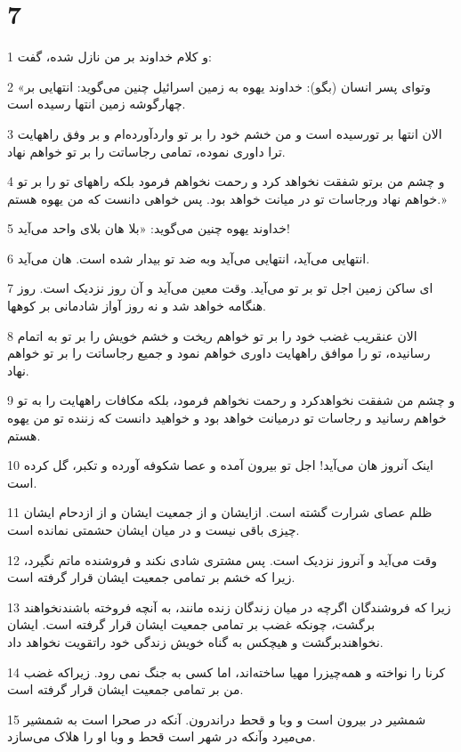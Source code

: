 \chapter{7}

\par 1 و کلام خداوند بر من نازل شده، گفت:
\par 2 «وتو‌ای پسر انسان (بگو): خداوند یهوه به زمین اسرائیل چنین می‌گوید: انتهایی بر چهارگوشه زمین انتها رسیده است.
\par 3 الان انتها بر تورسیده است و من خشم خود را بر تو واردآورده‌ام و بر وفق راههایت ترا داوری نموده، تمامی رجاساتت را بر تو خواهم نهاد.
\par 4 و چشم من برتو شفقت نخواهد کرد و رحمت نخواهم فرمود بلکه راههای تو را بر تو خواهم نهاد ورجاسات تو در میانت خواهد بود. پس خواهی دانست که من یهوه هستم.»
\par 5 خداوند یهوه چنین می‌گوید: «بلا هان بلای واحد می‌آید!
\par 6 انتهایی می‌آید، انتهایی می‌آید وبه ضد تو بیدار شده است. هان می‌آید.
\par 7 ‌ای ساکن زمین اجل تو بر تو می‌آید. وقت معین می‌آید و آن روز نزدیک است. روز هنگامه خواهد شد و نه روز آواز شادمانی بر کوهها.
\par 8 الان عنقریب غضب خود را بر تو خواهم ریخت و خشم خویش را بر تو به اتمام رسانیده، تو را موافق راههایت داوری خواهم نمود و جمیع رجاساتت را بر تو خواهم نهاد.
\par 9 و چشم من شفقت نخواهدکرد و رحمت نخواهم فرمود، بلکه مکافات راههایت را به تو خواهم رسانید و رجاسات تو درمیانت خواهد بود و خواهید دانست که زننده تو من یهوه هستم.
\par 10 اینک آنروز هان می‌آید! اجل تو بیرون آمده و عصا شکوفه آورده و تکبر، گل کرده است.
\par 11 ظلم عصای شرارت گشته است. ازایشان و از جمعیت ایشان و از ازدحام ایشان چیزی باقی نیست و در میان ایشان حشمتی نمانده است.
\par 12 وقت می‌آید و آنروز نزدیک است. پس مشتری شادی نکند و فروشنده ماتم نگیرد، زیرا که خشم بر تمامی جمعیت ایشان قرار گرفته است.
\par 13 زیرا که فروشندگان اگر‌چه در میان زندگان زنده مانند، به آنچه فروخته باشندنخواهند برگشت، چونکه غضب بر تمامی جمعیت ایشان قرار گرفته است. ایشان نخواهندبرگشت و هیچکس به گناه خویش زندگی خود راتقویت نخواهد داد.
\par 14 کرنا را نواخته و همه‌چیزرا مهیا ساخته‌اند، اما کسی به جنگ نمی رود. زیراکه غضب من بر تمامی جمعیت ایشان قرار گرفته است.
\par 15 شمشیر در بیرون است و وبا و قحط دراندرون. آنکه در صحرا است به شمشیر می‌میرد وآنکه در شهر است قحط و وبا او را هلاک می‌سازد.
